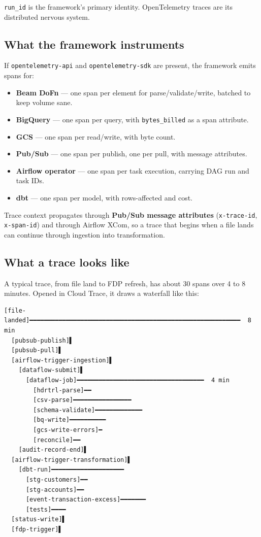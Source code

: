 \documentclass[
  11pt,
  british,
  oneside]{book}
\providecommand{\tightlist}{%
  \setlength{\itemsep}{0pt}\setlength{\parskip}{0pt}}
\begin{document}
\texttt{run\_id} is the framework's primary identity. OpenTelemetry
traces are its distributed nervous system.

\hypertarget{what-the-framework-instruments}{%
\subsection{What the framework
instruments}\label{what-the-framework-instruments}}

If \texttt{opentelemetry-api} and \texttt{opentelemetry-sdk} are
present, the framework emits spans for:

\begin{itemize}
\tightlist
\item
  \textbf{Beam DoFn} --- one span per element for parse/validate/write,
  batched to keep volume sane.
\item
  \textbf{BigQuery} --- one span per query, with \texttt{bytes\_billed}
  as a span attribute.
\item
  \textbf{GCS} --- one span per read/write, with byte count.
\item
  \textbf{Pub/Sub} --- one span per publish, one per pull, with message
  attributes.
\item
  \textbf{Airflow operator} --- one span per task execution, carrying
  DAG run and task IDs.
\item
  \textbf{dbt} --- one span per model, with rows-affected and cost.
\end{itemize}

Trace context propagates through \textbf{Pub/Sub message attributes}
(\texttt{x-trace-id}, \texttt{x-span-id}) and through Airflow XCom, so a
trace that begins when a file lands can continue through ingestion into
transformation.

\hypertarget{what-a-trace-looks-like}{%
\subsection{What a trace looks like}\label{what-a-trace-looks-like}}

A typical trace, from file land to FDP refresh, has about 30 spans over
4 to 8 minutes. Opened in Cloud Trace, it draws a waterfall like this:

\begin{verbatim}
[file-landed]━━━━━━━━━━━━━━━━━━━━━━━━━━━━━━━━━━━━━━━━━━━━━━━━━━━━━━━━━━  8 min
  [pubsub-publish]▌
  [pubsub-pull]▌
  [airflow-trigger-ingestion]▌
    [dataflow-submit]▌
      [dataflow-job]━━━━━━━━━━━━━━━━━━━━━━━━━━━━━━━━━━━  4 min
        [hdrtrl-parse]━━
        [csv-parse]━━━━━━━━━━━━━━━━
        [schema-validate]━━━━━━━━━━━━━
        [bq-write]━━━━━━━━━━
        [gcs-write-errors]━
        [reconcile]━━
    [audit-record-end]▌
  [airflow-trigger-transformation]▌
    [dbt-run]━━━━━━━━━━━━━━━━━━━━
      [stg-customers]━━
      [stg-accounts]━━
      [event-transaction-excess]━━━━━━━
      [tests]━━━━
  [status-write]▌
  [fdp-trigger]▌
\end{verbatim}
\end{document}
